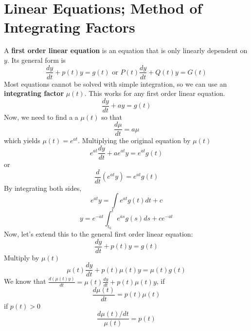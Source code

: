 \section{Linear Equations; Method of Integrating Factors}
    A \textbf{first order linear equation} is an equation that is only linearly dependent on $y$. Its general form is
    \begin{equation*}
        \frac{dy}{dt} + p(t)y = g(t) \text{ or } P(t)\frac{dy}{dt} + Q(t)y = G(t)
    \end{equation*}
    Most equations cannot be solved with simple integration, so we can use an \textbf{integrating factor} $\mu(t)$. This works for any first order linear equation. 
    \begin{equation*}
        \frac{dy}{dt} + ay = g(t)
    \end{equation*}
    Now, we need to find a a $\mu(t)$ so that
    \begin{equation*}
        \frac{d\mu}{dt} = a\mu
    \end{equation*}
    which yields $\mu(t) = e^{at}$. Multiplying the original equation by $\mu(t)$
    \begin{equation*}
        e^{at}\frac{dy}{dt} + ae^{at}y = e^{at}g(t)
    \end{equation*}
    or
    \begin{equation*}
        \frac{d}{dt}(e^{at}y) = e^{at}g(t)
    \end{equation*}
    By integrating both sides,
    \begin{equation*}
        e^{at}y = \int e^{at}g(t)dt + c
    \end{equation*}
    \begin{equation*}
        y = e^{-at}\int_{t_0}^te^{as}g(s)ds + ce^{-at}
    \end{equation*}
    Now, let's extend this to the general first order linear equation:
    \begin{equation*}
        \frac{dy}{dt} + p(t)y = g(t)
    \end{equation*}
    Multiply by $\mu(t)$
    \begin{equation*}
        \mu(t)\frac{dy}{dt} + p(t)\mu(t)y = \mu(t)g(t)
    \end{equation*}
    We know that $\frac{d(\mu(t)y)}{dt} = \mu(t)\frac{dy}{dt} + p(t)\mu(t)y$, if
    \begin{equation*}
        \frac{d\mu(t)}{dt} = p(t)\mu(t)
    \end{equation*}
    if $p(t) > 0$
    \begin{equation*}
        \frac{d\mu(t) / dt}{\mu(t)} = p(t)
    \end{equation*}
